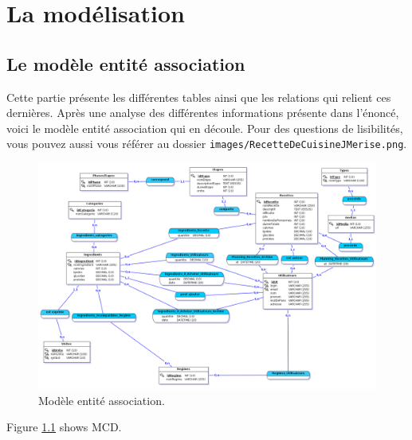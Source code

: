 \chapter{La modélisation}

\section{Le modèle entité association}
Cette partie présente les différentes tables ainsi que les relations
qui relient ces dernières. Après une analyse des différentes informations présente dans l'énoncé, voici le modèle entité association qui en découle. Pour des questions de lisibilités, vous pouvez aussi vous référer au dossier \texttt{images/RecetteDeCuisineJMerise.png}.

\begin{figure}
    \includegraphics[scale=0.3]{images/RecetteDeCuisineJMerise.png}
    \caption{Modèle entité association.}
    \label{fig:modele E/A}
\end{figure}
Figure \ref{fig:modele E/A} shows MCD.

